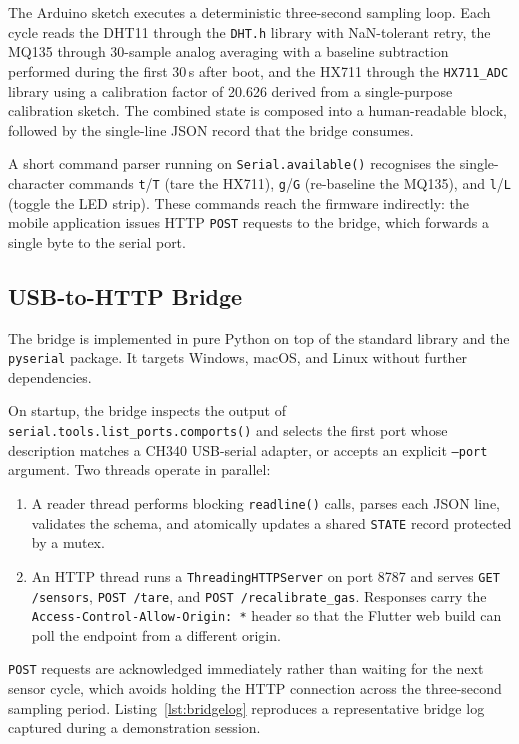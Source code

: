 The Arduino sketch executes a deterministic three-second sampling
loop. Each cycle reads the DHT11 through the \texttt{DHT.h} library
with NaN-tolerant retry, the MQ135 through 30-sample analog averaging
with a baseline subtraction performed during the first 30\,s after
boot, and the HX711 through the \texttt{HX711\_ADC} library using a
calibration factor of 20.626 derived from a single-purpose
calibration sketch. The combined state is composed into a
human-readable block, followed by the single-line JSON record that
the bridge consumes.

A short command parser running on \texttt{Serial.available()}
recognises the single-character commands \texttt{t}/\texttt{T} (tare
the HX711), \texttt{g}/\texttt{G} (re-baseline the MQ135), and
\texttt{l}/\texttt{L} (toggle the LED strip). These commands reach
the firmware indirectly: the mobile application issues HTTP
\texttt{POST} requests to the bridge, which forwards a single byte to
the serial port.

\subsection{USB-to-HTTP Bridge}
\label{sec:impl-bridge}

The bridge is implemented in pure Python on top of the standard
library and the \texttt{pyserial} package. It targets Windows, macOS,
and Linux without further dependencies.

On startup, the bridge inspects the output of
\texttt{serial.tools.list\_ports.comports()} and selects the first
port whose description matches a CH340 USB-serial adapter, or accepts
an explicit \texttt{--port} argument. Two threads operate in parallel:

\begin{enumerate}
  \item A reader thread performs blocking \texttt{readline()} calls,
        parses each JSON line, validates the schema, and atomically
        updates a shared \texttt{STATE} record protected by a mutex.
  \item An HTTP thread runs a \texttt{ThreadingHTTPServer} on port
        8787 and serves \texttt{GET /sensors}, \texttt{POST /tare}, and
        \texttt{POST /recalibrate\_gas}. Responses carry the
        \texttt{Access-Control-Allow-Origin: *} header so that the
        Flutter web build can poll the endpoint from a different
        origin.
\end{enumerate}

\texttt{POST} requests are acknowledged immediately rather than
waiting for the next sensor cycle, which avoids holding the HTTP
connection across the three-second sampling period.
Listing~\ref{lst:bridgelog} reproduces a representative bridge log
captured during a demonstration session.

